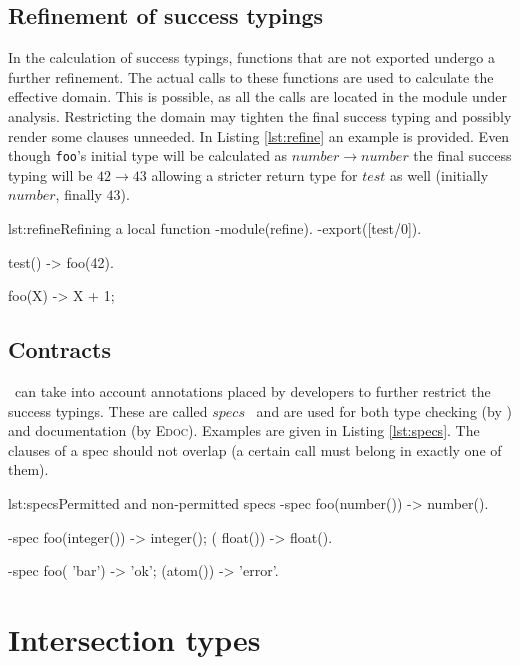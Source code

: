\subsection{Refinement of success typings}

In the calculation of success typings, functions that are not
exported undergo a further refinement. The actual calls to these
functions are used to calculate the effective domain. This is
possible, as all the calls are located in the module under
analysis. Restricting the domain may tighten the final success typing
and possibly render some clauses unneeded. In Listing \ref{lst:refine}
an example is provided. Even though \texttt{foo}'s initial type will be
calculated as $number \rightarrow number$ the final success typing
will be $42 \rightarrow 43$ allowing a stricter return type for $test$
as well (initially $number$, finally $43$).

\begin{console}{lst:refine}{Refining a local function}
-module(refine).
-export([test/0]).

test() ->
  foo(42).

foo(X) -> X + 1;
\end{console}

\subsection{Contracts}

\dr\ can take into account annotations placed by developers to further
restrict the success typings. These are called
$specs$~\cite{type_system} and are used for both type checking (by
\dr) and documentation (by \mbox{\textsc{Edoc}}). Examples are given
in Listing \ref{lst:specs}. The clauses of a spec should not overlap
(a certain call must belong in exactly one of them).

\begin{console}{lst:specs}{Permitted and non-permitted specs}
-spec foo(number()) -> number().

-spec foo(integer()) -> integer();
         (  float()) -> float().

-spec foo( 'bar') -> 'ok';
         (atom()) -> 'error'.
\end{console}

\section{Intersection types}
\label{sct:intersection_preliminaries}

